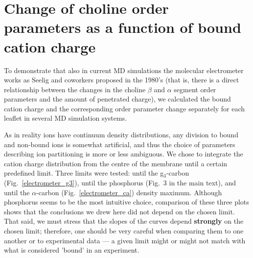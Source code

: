 \documentclass[twoside,twocolumn,9pt]{article}
\begin{document}
\section{Change of choline order parameters as a function of bound cation charge}


To demonstrate that also in current MD simulations the molecular electrometer works as Seelig and coworkers proposed in the 1980's (that is, there is a direct relationship between the changes in the choline $\beta$ and $\alpha$ segment order parameters and the amount of penetrated charge), we calculated the bound cation charge and the corresponding order parameter change separately for each leaflet in several MD simulation systems.

As in reality ions have continuum density distributions, any division to bound and non-bound ions is somewhat artificial,
and thus the choice of parameters describing ion partitioning is more or less ambiguous.
We chose to integrate the cation charge distribution from the centre of the membrane until a certain predefined limit. Three limits were tested:
until the g$_3$-carbon (Fig.~\ref{electrometer_g3}), until the phosphorus (Fig.~3 in the main text), and until the $\alpha$-carbon (Fig.~\ref{electrometer_ca}) density maximum. Although phosphorus seems to be the most intuitive choice, comparison of these three plots shows that the conclusions we drew here did not depend on the chosen limit.
That said, we must stress that the slopes of the curves depend {\bf strongly} on the chosen limit; therefore, one should be very careful when comparing them to one another or to experimental data --- a given limit might or might not match with what is considered 'bound' in an experiment.
\end{document}
